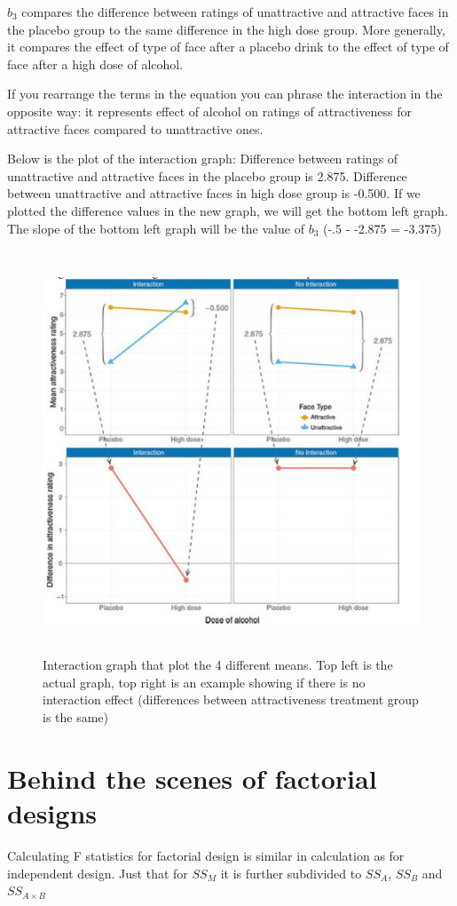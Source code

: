 \documentclass[a4paper, 12pt]{book}
\begin{document}
$b_3$ compares the difference between ratings of unattractive and attractive faces in the placebo group to the same difference in the high dose group. More generally, it compares the effect of type of face after a placebo drink to the effect of type of face after a high dose of alcohol. 

If you rearrange the terms in the equation you can phrase the interaction in the opposite way: it represents effect of alcohol on ratings of attractiveness for attractive faces compared to unattractive ones.

Below is the plot of the interaction graph:
Difference between ratings of unattractive and attractive faces in the placebo group is 2.875. Difference between unattractive and attractive faces in high dose group is -0.500. If we plotted the difference values in the new graph, we will get the bottom left graph. The slope of the bottom left graph will be the value of $b_3$ (-.5 - -2.875 = -3.375)
\begin{figure}[h]
	\includegraphics[width=1\textwidth,height=120mm]{Chapter 14 GLM 3 Factorial Designs/interactiongraph.PNG}
	\caption{Interaction graph that plot the 4 different means. Top left is the actual graph, top right is an example showing if there is no interaction effect (differences between attractiveness treatment group is the same)}
\end{figure}

\clearpage
\section{Behind the scenes of factorial designs}
Calculating F statistics for factorial design is similar in calculation as for independent design. Just that for $SS_M$ it is further subdivided to $SS_A$, $SS_B$ and $SS_{A\times B}$
\end{document}
